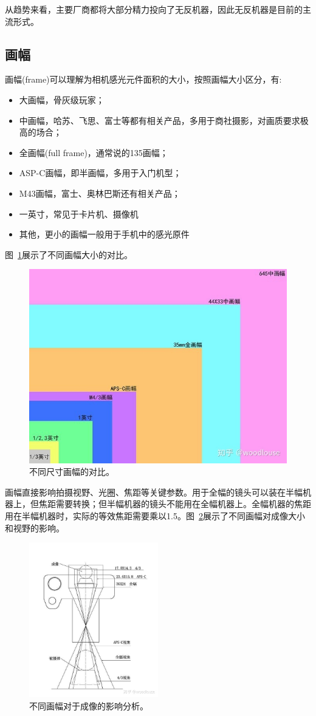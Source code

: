 \documentclass{ctexart}
\begin{document}
从趋势来看，主要厂商都将大部分精力投向了无反机器，因此无反机器是目前的主流形式。

\subsection{画幅~\cite{frame}}
画幅(frame)可以理解为相机感光元件面积的大小，按照画幅大小区分，有:
\begin{itemize}
    \item 大画幅，骨灰级玩家；
    \item 中画幅，哈苏、飞思、富士等都有相关产品，多用于商社摄影，对画质要求极高的场合；
    \item 全画幅(full frame)，通常说的135画幅；
    \item ASP-C画幅，即半画幅，多用于入门机型；
    \item M43画幅，富士、奥林巴斯还有相关产品；
    \item 一英寸，常见于卡片机、摄像机
    \item 其他，更小的画幅一般用于手机中的感光原件
\end{itemize}
图~\ref{fig_frame_comparison}展示了不同画幅大小的对比。
\begin{figure}[h]
    \centering
    \includegraphics[width=.60\textwidth]{imgs/frame.jpeg}
    \caption{不同尺寸画幅的对比。}
    \label{fig_frame_comparison}
\end{figure}
画幅直接影响拍摄视野、光圈、焦距等关键参数。用于全幅的镜头可以装在半幅机器上，但焦距需要转换；但半幅机器的镜头不能用在全幅机器上。全幅机器的焦距用在半幅机器时，实际的等效焦距需要乘以1.5。图~\ref{fig_frame_photo}展示了不同画幅对成像大小和视野的影响。
\begin{figure}[!h]
    \centering
    \includegraphics[width=0.5\textwidth]{imgs/frame_photo.jpg}
    \caption{不同画幅对于成像的影响分析。}
    \label{fig_frame_photo}
\end{figure}
\end{document}
